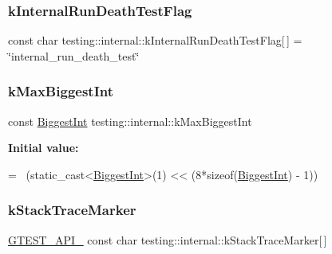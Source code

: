 \subsubsection{\texorpdfstring{k\+Internal\+Run\+Death\+Test\+Flag}{kInternalRunDeathTestFlag}}
{\footnotesize\ttfamily const char testing\+::internal\+::k\+Internal\+Run\+Death\+Test\+Flag\mbox{[}$\,$\mbox{]} = \char`\"{}internal\+\_\+run\+\_\+death\+\_\+test\char`\"{}}

\mbox{\label{namespacetesting_1_1internal_ad901880198832bc166d2493096b451f7}} 
\subsubsection{\texorpdfstring{k\+Max\+Biggest\+Int}{kMaxBiggestInt}}
{\footnotesize\ttfamily const \hyperlink{namespacetesting_1_1internal_a05c6bd9ede5ccdf25191a590d610dcc6}{Biggest\+Int} testing\+::internal\+::k\+Max\+Biggest\+Int}

{\bfseries Initial value\+:}
\begin{DoxyCode}
=
    ~(\textcolor{keyword}{static\_cast<}\hyperlink{namespacetesting_1_1internal_a05c6bd9ede5ccdf25191a590d610dcc6}{BiggestInt}\textcolor{keyword}{>}(1) << (8*\textcolor{keyword}{sizeof}(\hyperlink{namespacetesting_1_1internal_a05c6bd9ede5ccdf25191a590d610dcc6}{BiggestInt}) - 1))
\end{DoxyCode}
\mbox{\label{namespacetesting_1_1internal_a999c7ef9ff01b6d2d76669372c444aa3}} 
\subsubsection{\texorpdfstring{k\+Stack\+Trace\+Marker}{kStackTraceMarker}}
{\footnotesize\ttfamily \hyperlink{gtest-port_8h_aa73be6f0ba4a7456180a94904ce17790}{G\+T\+E\+S\+T\+\_\+\+A\+P\+I\+\_\+} const char testing\+::internal\+::k\+Stack\+Trace\+Marker\mbox{[}$\,$\mbox{]}}

